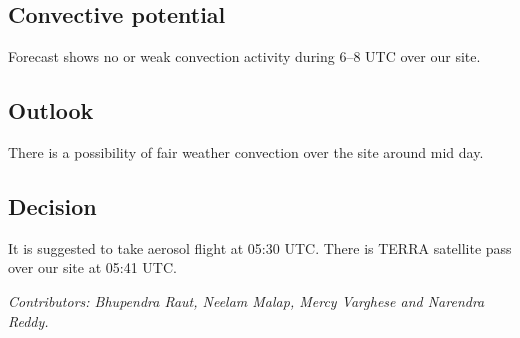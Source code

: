 \subsection*{Convective potential}
Forecast shows no or weak convection activity during 6--8 UTC over our site. %

\subsection*{Outlook}
There is a possibility of fair weather convection over the site around mid day.\\
\subsection*{Decision}
It is suggested to take aerosol flight at 05:30 UTC. 
There is TERRA satellite pass over our site at 05:41 UTC.



\vfill %
\textit{Contributors: Bhupendra Raut, Neelam Malap, Mercy Varghese and Narendra Reddy.} 

